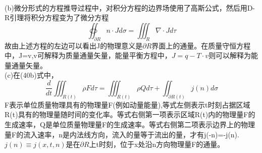\documentclass[UTF8]{ctexart}
\begin{document}
\\(b)微分形式的方程推导过程中，对积分方程的边界场使用了高斯公式，然后用D-R引理将积分方程变为了微分方程
$$\oiint_{\partial R}n\cdot Jd\sigma = \iiint_{R}\nabla\cdot Jd\tau$$
故由上述方程的左边可以看出J的物理意义是$\partial R$界面上的通量。在质量守恒方程中，J=v,v可解释为质量通量矢量，能量平衡方程中，$J = q-T\cdot v$则可以解释为能量通量矢量。
\\(c)在(40b)式中，
$$\frac{d}{dt}\iiint_{R(t)}\rho Fd\tau = 
\iiint_{R(t)}\rho Qd\tau + \iint_{\partial R(t)}j(n)d\sigma$$
F表示单位质量物理具有的物理量F(例如动量能量),等式左侧表示t时刻占据区域R(t)具有的物理量随时间的变化率。等式右侧第一项表示区域R(t)内的物理量F的生成速率，Q是单位质量物理量F的生成速率。等式右侧第二项表示边界上的物理量F的流入速率，n是内法线方向，流入的量等于流出的量，才有j(-n)=-j(n). $j(n)\equiv j(x,t,n)$是在$\partial R$上t时刻，位于x处沿n方向物理量F的通量。
\end{document}
